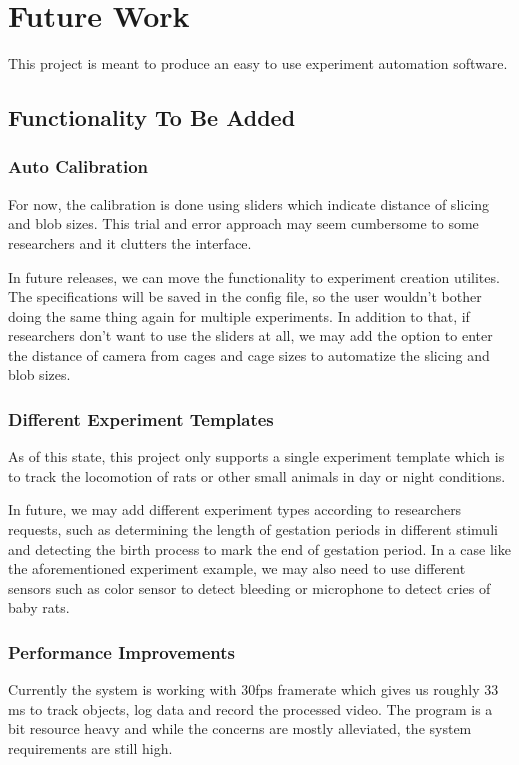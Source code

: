 \chapter{Future Work}
This project is meant to produce an easy to use experiment automation software. 
\section{Functionality To Be Added}

\subsection{Auto Calibration}

For now, the calibration is done using sliders which indicate distance of slicing and blob sizes. This trial and error approach may seem cumbersome to some researchers and it clutters the interface. 

In future releases, we can move the functionality to experiment creation utilites. The specifications will be saved in the config file, so the user wouldn't bother doing the same thing again for multiple experiments. In addition to that, if researchers don't want to use the sliders at all, we may add the option to enter the distance of camera from cages and cage sizes to automatize the slicing and blob sizes.

\subsection{Different Experiment Templates}

As of this state, this project only supports a single experiment template which is to track the locomotion of rats or other small animals in day or night conditions.

In future, we may add different experiment types according to researchers requests, such as determining the length of gestation periods in different stimuli and detecting the birth process to mark the end of gestation period. In a case like the aforementioned experiment example, we may also need to use different sensors such as color sensor to detect bleeding or microphone to detect cries of baby rats.

\subsection{Performance Improvements}
Currently the system is working with 30fps framerate which gives us roughly 33 ms to track objects, log data and record the processed video. The program is a bit resource heavy and while the concerns are mostly alleviated, the system requirements are still high.

